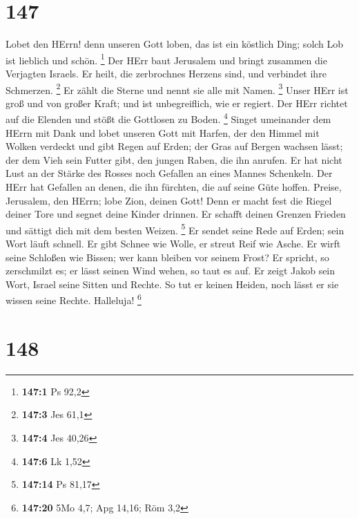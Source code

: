\hypertarget{section-46}{%
\section{147}\label{section-46}}

 Lobet den HErrn! denn unseren Gott loben, das ist ein
köstlich Ding; solch Lob ist lieblich und schön. \footnote{\textbf{147:1}
  Ps 92,2}  Der HErr baut Jerusalem und bringt zusammen die
Verjagten Israels.  Er heilt, die zerbrochnes Herzens sind,
und verbindet ihre Schmerzen. \footnote{\textbf{147:3} Jes 61,1}
 Er zählt die Sterne und nennt sie alle mit Namen.
\footnote{\textbf{147:4} Jes 40,26}  Unser HErr ist groß und
von großer Kraft; und ist unbegreiflich, wie er regiert. 
Der HErr richtet auf die Elenden und stößt die Gottlosen zu Boden.
\footnote{\textbf{147:6} Lk 1,52}  Singet umeinander dem
HErrn mit Dank und lobet unseren Gott mit Harfen,  der den
Himmel mit Wolken verdeckt und gibt Regen auf Erden; der Gras auf Bergen
wachsen lässt;  der dem Vieh sein Futter gibt, den jungen
Raben, die ihn anrufen.  Er hat nicht Lust an der Stärke
des Rosses noch Gefallen an eines Mannes Schenkeln.  Der
HErr hat Gefallen an denen, die ihn fürchten, die auf seine Güte hoffen.
 Preise, Jerusalem, den HErrn; lobe Zion, deinen Gott!
 Denn er macht fest die Riegel deiner Tore und segnet deine
Kinder drinnen.  Er schafft deinen Grenzen Frieden und
sättigt dich mit dem besten Weizen. \footnote{\textbf{147:14} Ps 81,17}
 Er sendet seine Rede auf Erden; sein Wort läuft schnell.
 Er gibt Schnee wie Wolle, er streut Reif wie Asche.
 Er wirft seine Schloßen wie Bissen; wer kann bleiben vor
seinem Frost?  Er spricht, so zerschmilzt es; er lässt
seinen Wind wehen, so taut es auf.  Er zeigt Jakob sein
Wort, Israel seine Sitten und Rechte.  So tut er keinen
Heiden, noch lässt er sie wissen seine Rechte. Halleluja! \footnote{\textbf{147:20}
  5Mo 4,7; Apg 14,16; Röm 3,2}

\hypertarget{section-47}{%
\section{148}\label{section-47}}

